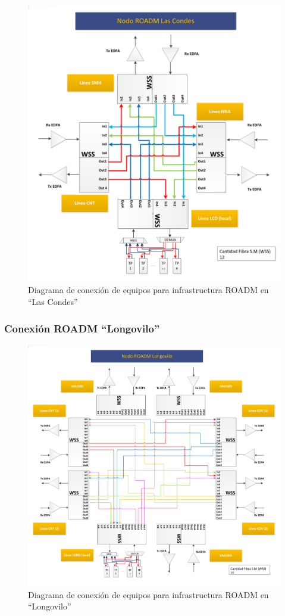 \begin{figure}[H]
  \centering
  \includegraphics[width=17cm]{Imagenes/LCD.pdf}
  \caption{Diagrama de conexión de equipos para infrastructura ROADM en ``Las Condes''}
  \label{fig:drlcd}
\end{figure}

\subsubsection{Conexión ROADM ``Longovilo''}
\label{sec:drlong}

\begin{figure}[H]
  \centering
  \includegraphics[width=17cm]{Imagenes/LONG.pdf}
  \caption{Diagrama de conexión de equipos para infrastructura ROADM en ``Longovilo''}
  \label{fig:drlong}
\end{figure}

